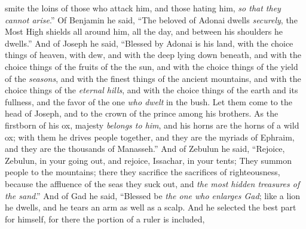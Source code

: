 \begin{biblechapter}
smite the loins of those who attack him, 
and those hating him, \textit{so that they cannot arise}.”
\verse Of Benjamin he said, 
“The beloved of Adonai dwells \textit{securely}, 
the Most High shields all around him, 
all the day, 
and between his shoulders he dwells.”
\verse And of Joseph he said, 
“Blessed by Adonai is his land, 
with the choice things of heaven, 
with dew, and with the deep lying down beneath,
\verse and with the choice things of the fruits of the the sun, 
and with the choice things of the yield of the \textit{seasons},
\verse and with the finest things of the ancient mountains, 
and with the choice things of the \textit{eternal hills},
\verse and with the choice things of the earth and its fullness, 
and the favor of the one \textit{who dwelt} in the bush. 
Let them come to the head of Joseph, 
and to the crown of the prince among his brothers.
\verse As the firstborn of his ox, majesty \textit{belongs to him}, 
and his horns are the horns of a wild ox; 
with them he drives people together, 
and they are the myriads of Ephraim, 
and they are the thousands of Manasseh.”
\verse And of Zebulun he said, 
“Rejoice, Zebulun, in your going out, 
and rejoice, Issachar, in your tents;
\verse They summon people to the mountains; 
there they sacrifice the sacrifices of righteousness, 
because the affluence of the seas they suck out, 
and \textit{the most hidden treasures of the sand}.”
\verse And of Gad he said, 
“Blessed be \textit{the one who enlarges Gad}; 
like a lion he dwells, 
and he tears an arm as well as a scalp.
\verse And he selected the best part for himself,  
for there the portion of a ruler is included, 

\end{biblechapter}
